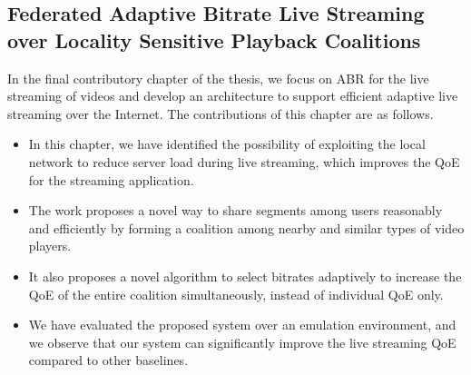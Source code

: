 \subsection{Federated Adaptive Bitrate Live Streaming over Locality Sensitive Playback Coalitions}
In the final contributory chapter of the thesis, we focus on ABR for the live streaming of videos and develop an architecture to support efficient adaptive live streaming over the Internet. The contributions of this chapter are as follows. 
\begin{itemize}
	\item In this chapter, we have identified the possibility of exploiting the local network to reduce server load during live streaming, which improves the QoE for the streaming application.
	\item The work proposes a novel way to share segments among users reasonably and efficiently by forming a coalition among nearby and similar types of video players.
	\item It also proposes a novel algorithm to select bitrates adaptively to increase the QoE of the entire coalition simultaneously, instead of individual QoE only.
	\item We have evaluated the proposed system over an emulation environment, and we observe that our system can significantly improve the live streaming QoE compared to other baselines. 
\end{itemize}